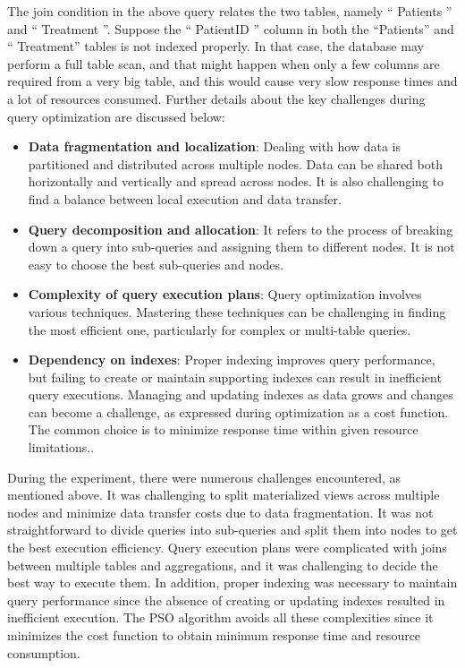 

The join condition in the above query relates the two tables, namely `` Patients '' and `` Treatment ''. Suppose the `` PatientID '' column in both the ``Patients'' and `` Treatment'' tables is not indexed properly. In that case, the database may perform a full table scan, and that might happen when only a few columns are required from a very big table, and this would cause very slow response times and a lot of resources consumed. Further details about the key challenges during query optimization are discussed below:

\begin{itemize}
    \item\textbf{Data fragmentation and localization}: Dealing with how data is partitioned and distributed across multiple nodes. Data can be shared both horizontally and vertically and spread across nodes. It is also challenging to find a balance between local execution and data transfer.
    
    \item\textbf{Query decomposition and allocation}: It refers to the process of breaking down a query into sub-queries and assigning them to different nodes. It is not easy to choose the best sub-queries and nodes.
    
    \item\textbf{Complexity of query execution plans}: Query optimization involves various techniques. Mastering these techniques can be challenging in finding the most efficient one, particularly for complex or multi-table queries.
    
    \item\textbf{Dependency on indexes}: Proper indexing improves query performance, but failing to create or maintain supporting indexes can result in inefficient query executions. Managing and updating indexes as data grows and changes can become a challenge, as expressed during optimization as a cost function. The common choice is to minimize response time within given resource limitations.\cite{team-2020,etutorials-03-2024,editor-ijmter-2015}.
\end{itemize}

During the experiment, there were numerous challenges encountered, as mentioned above. It was challenging to split materialized views across multiple nodes and minimize data transfer costs due to data fragmentation. It was not straightforward to divide queries into sub-queries and split them into nodes to get the best execution efficiency. Query execution plans were complicated with joins between multiple tables and aggregations, and it was challenging to decide the best way to execute them. In addition, proper indexing was necessary to maintain query performance since the absence of creating or updating indexes resulted in inefficient execution. The PSO algorithm avoids all these complexities since it minimizes the cost function to obtain minimum response time and resource consumption. 

